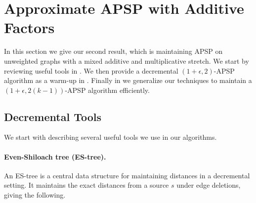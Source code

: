 \newpage
\section{Approximate APSP with Additive Factors}\label{sc:additive}
In this section we give our second result, which is maintaining APSP on unweighted graphs with a mixed additive and multiplicative stretch. We start by reviewing useful tools in .  We then provide a decremental $(1+\epsilon, 2)$-APSP algorithm as a warm-up in . Finally in  we generalize our techniques to maintain a $(1+\epsilon, 2(k-1))$-APSP algorithm efficiently.


\subsection{Decremental Tools}  \label{sec:additive_tools}

We start with describing several useful tools we use in our algorithms.


\paragraph{Even-Shiloach tree (ES-tree).} An ES-tree is a central data structure for maintaining distances in a decremental setting. It maintains the exact distances from a source $s$ under edge deletions, giving the following.


